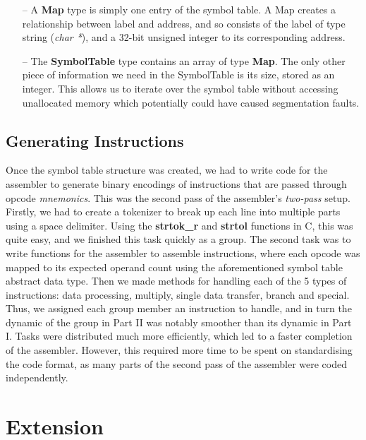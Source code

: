 \documentclass[11pt]{article}
\begin{document}
\begin{itemize}
  \item[--] A \textbf{Map} type is simply one entry of the symbol table. A Map creates a relationship between label and address, and so consists of the label of type string (\emph{char *}), and a 32-bit unsigned integer to its corresponding address.

  \item[--] The \textbf{SymbolTable} type contains an array of type \textbf{Map}. The only other piece of information we need in the SymbolTable is its size, stored as an integer. This allows us to iterate over the symbol table without accessing unallocated memory which potentially could have caused segmentation faults.

\end{itemize}

\subsection{Generating Instructions}

Once the symbol table structure was created, we had to write code for the assembler to generate binary encodings of instructions that are passed through opcode \emph{mnemonics}. This was the second pass of the assembler's \emph{two-pass} setup. Firstly, we had to create a tokenizer to break up each line into multiple parts using a space delimiter. Using the \textbf{strtok\_r} and \textbf{strtol} functions in C, this was quite easy, and we finished this task quickly as a group. The second task was to write functions for the assembler to assemble instructions, where each opcode was mapped to its expected operand count using the aforementioned symbol table abstract data type. Then we made methods for handling each of the 5 types of instructions: data processing, multiply, single data transfer, branch and special. Thus, we assigned each group member an instruction to handle, and in turn the dynamic of the group in Part II was notably smoother than its dynamic in Part I. Tasks were distributed much more efficiently, which led to a faster completion of the assembler. However, this required more time to be spent on standardising the code format, as many parts of the second pass of the assembler were coded independently.

\section{Extension}
\end{document}
